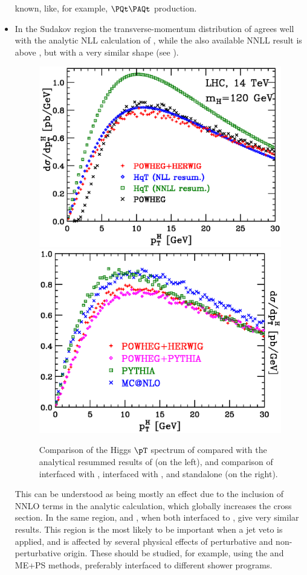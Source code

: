 \begin{itemize}
      known, like, for example, $\PQt\PAQt$ production.
\item In the Sudakov region the transverse-momentum distribution of \POWHEG{} 
      agrees well with the analytic NLL calculation of , 
      while the also available NNLL result is above \POWHEG{}, but with a 
      very similar shape (see ).
\begin{figure}[htb]
\centering
\includegraphics[width=.48\linewidth]{YRHXS_NLOMC/YRHXS_NLOMC_fig3.eps}
\includegraphics[width=.48\linewidth]{YRHXS_NLOMC/YRHXS_NLOMC_fig4.eps}
\caption{Comparison of the Higgs $\pT$ spectrum
of {\protect \POWHEG}
compared with the analytical resummed results of 
(on the left), and comparison of {\protect \POWHEG} interfaced with
{\protect \pythia},  {\protect \POWHEG} interfaced with
{\protect \herwig}, {\protect \MCatNLO} and {\protect \pythia}
standalone (on the right).}
\label{fig:HqTpwg}
\end{figure}
      This can be understood as being mostly an effect 
      due to the inclusion of NNLO terms in the analytic calculation,
      which globally increases the cross section.  In the same region, 
      \MCatNLO{} and \POWHEG{}, when both interfaced to \herwig{}, give very 
      similar results.  This region is the most likely to be important when a 
      jet veto is applied, and is affected by several physical effects of 
      perturbative and non-perturbative origin. These should be studied, 
      for example, using the \POWHEG{} and ME+PS methods, preferably 
      interfaced to different shower programs.
\end{itemize}

